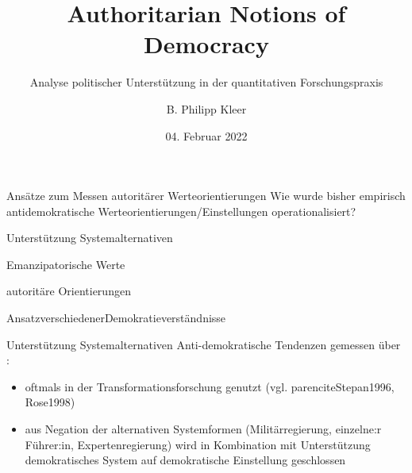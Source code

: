 \documentclass[11pt]{beamer}
\title{Authoritarian Notions of Democracy}
\subtitle{Analyse politischer Unterstützung in der quantitativen Forschungspraxis}
\date{04. Februar 2022}
\author{B. Philipp Kleer}
\institute{Institut für Politikwissenschaft | Justus-Liebig-Universität Gießen}
\begin{document}
\begin{frame}
	\maketitle
\end{frame}


\begin{frame}[t]{Ansätze zum Messen autoritärer Werteorientierungen}
 Wie wurde bisher empirisch antidemokratische Werteorientierungen/Einstellungen operationalisiert?
 
	\begin{abclist}
	 	\item Unterstützung Systemalternativen
	 	\item Emanzipatorische Werte
	 	\item autoritäre Orientierungen
	 	\item AnsatzverschiedenerDemokratieverständnisse
	\end{abclist}
\end{frame}

\begin{frame}{Unterstützung Systemalternativen}
Anti-demokratische Tendenzen gemessen über :

	\begin{itemize}
		\item oftmals in der Transformationsforschung genutzt (vgl. parencite{Stepan1996, Rose1998})
		\item aus Negation der alternativen Systemformen (Militärregierung, einzelne:r Führer:in, Expertenregierung) wird in Kombination mit Unterstützung demokratisches System auf demokratische Einstellung geschlossen
	\end{itemize}

\end{frame}
\end{document}
